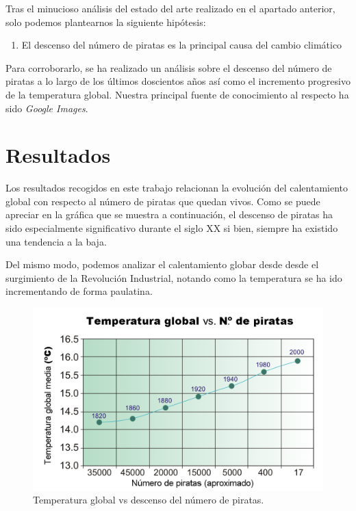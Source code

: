 \documentclass{article}
\begin{document}
Tras el minucioso análisis del estado del arte realizado en el apartado anterior, solo podemos plantearnos la siguiente hipótesis:

\begin{enumerate}
    \item El descenso del número de piratas es la principal causa del cambio climático
\end{enumerate}

Para corroborarlo, se ha realizado un análisis sobre el descenso del número de piratas a lo largo de los últimos doscientos años así como el incremento progresivo de la temperatura global. Nuestra principal fuente de conocimiento al respecto ha sido \emph{Google Images}.

\section{Resultados}

Los resultados recogidos en este trabajo relacionan la evolución del calentamiento global con respecto al número de piratas que quedan vivos. Como se puede apreciar en la gráfica que se muestra a continuación, el descenso de piratas ha sido especialmente significativo durante el siglo XX si bien, siempre ha existido una tendencia a la baja.

Del mismo modo, podemos analizar el calentamiento globar desde desde el surgimiento de la Revolución Industrial, notando como la temperatura se ha ido incrementando de forma paulatina.


\begin{figure}
  \includegraphics[width=\linewidth]{graph_1.png}
  \caption{Temperatura global vs descenso del número de piratas.}
  \label{fig:grafico_1}
\end{figure}
\end{document}
